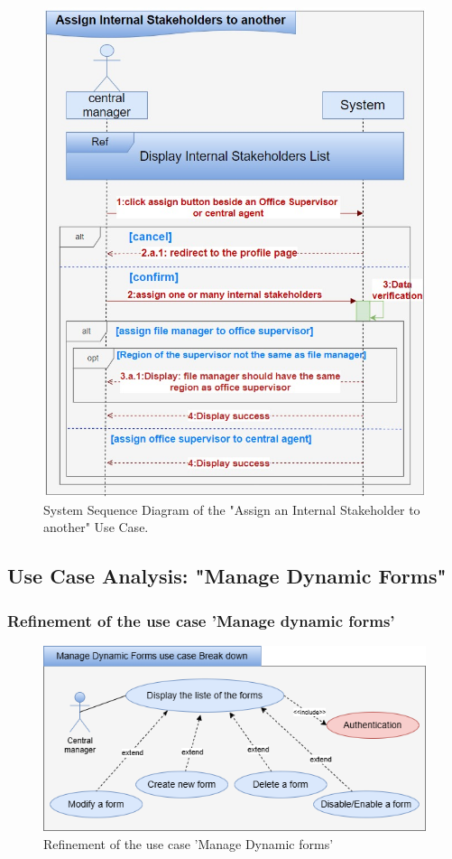 \clearpage
\begin{figure}[h!]
    \centering
    \includegraphics[width=1\textwidth]{figures/seqassign internal stakeholders.png}
    \caption{System Sequence Diagram of the "Assign an Internal Stakeholder to another" Use Case.}
\end{figure}
\clearpage

\subsection{Use Case Analysis: "Manage Dynamic Forms"}
\subsubsection{Refinement of the use case 'Manage dynamic forms'}
\begin{figure}[h!]
    \centering
    \includegraphics[width=1\textwidth]{figures/bdmanages dynamic forms-Break down.png}
    \caption{Refinement of the use case 'Manage Dynamic forms'}
\end{figure}\

